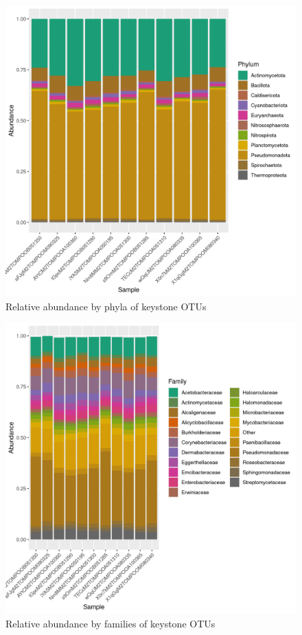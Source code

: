 \begin{figure}
\centering
\includegraphics[scale = 0.8]{tomate_aleatorio1_10.csv_relative_abundance_Phylum.png}
\caption{Relative abundance by phyla of keystone OTUs }
\label{fig:tomate_aleatorio1_10.csv_phyla}
\end{figure}
\begin{figure}
\centering
\includegraphics[scale = 0.8]{tomate_aleatorio1_10.csv_relative_abundance_Family.png}
\caption{Relative abundance by families of keystone OTUs }
\label{fig:tomate_aleatorio1_10.csv_family}
\end{figure}
